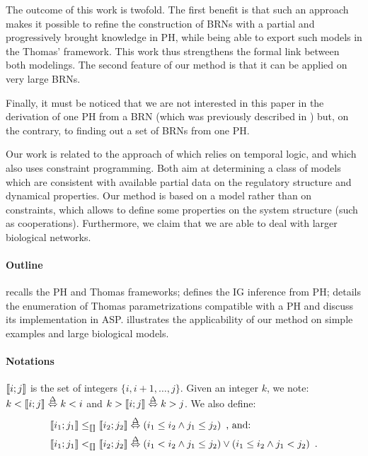 The outcome of this work is twofold.
The first benefit is that such an approach makes it possible to refine the construction of
BRNs with a partial and progressively brought knowledge in PH, while being able to export such
models in the Thomas' framework.
This work thus strengthens the formal link between both modelings.
The second feature of our method is that it can be applied on very large BRNs.

Finally, it must be noticed that we are not interested in this paper in the derivation of one
PH from a BRN (which was previously described in \cite{PMR10-TCSB}) but, on the contrary, to finding out
a set of BRNs from one PH.

Our work is related to the approach of \cite{Khalis09} which relies on temporal logic, and \cite{20646302,DBLP:conf/ipcat/CorblinFTCT12} which also uses constraint programming.
Both aim at determining a class of models which are consistent with available partial data on the regulatory structure and dynamical properties.
Our method is based on a model rather than on constraints, which allows to define some properties on the system structure (such as cooperations).
Furthermore, we claim that we are able to deal with larger biological networks.

\paragraph{Outline}
 recalls the PH and Thomas frameworks;
 defines the IG inference from PH;
 details the enumeration of Thomas parametrizations compatible with a PH
and discuss its implementation in ASP.
 illustrates the applicability of our method on simple examples
and large biological models.

\paragraph{Notations}
$\llbracket i ; j \rrbracket$ is the set of integers $\{ i, i+1, \dots, j \}$.
Given an integer $k$, we note: $k < \llbracket i ; j \rrbracket \stackrel{\Delta}\Leftrightarrow k < i$ and $k > \llbracket i ; j \rrbracket \stackrel{\Delta}\Leftrightarrow k > j$.
We also define:
\begin{align*}
  \llbracket i_1 ; j_1 \rrbracket \leq_{\llbracket\rrbracket} \llbracket i_2 ; j_2 \rrbracket &\stackrel{\Delta}\Leftrightarrow (i_1\leq i_2\wedge j_1\leq j_2) \enspace\text{, and:}\\
  \llbracket i_1 ; j_1 \rrbracket <_{\llbracket\rrbracket} \llbracket i_2 ; j_2 \rrbracket &\stackrel{\Delta}\Leftrightarrow (i_1<i_2 \wedge j_1\leq j_2) \vee (i_1\leq i_2\wedge j_1 < j_2) \enspace.
\end{align*}
